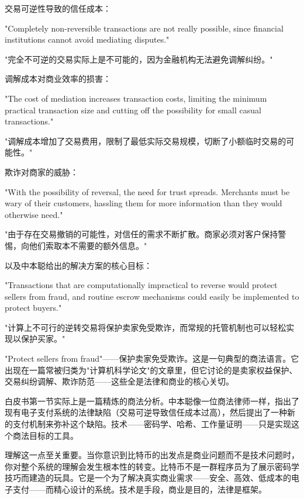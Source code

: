 \documentclass[a4paper,12pt,openany]{ctexbook}
\newenvironment{quoting}{%
  \par\vspace{0.5em}%
  \begin{list}{}{%
    \setlength{\leftmargin}{2em}%
    \setlength{\rightmargin}{2em}%
    \setlength{\parsep}{0.3em}%
    \setlength{\itemsep}{0pt}%
    \setlength{\topsep}{0pt}%
  }%
  \item\relax
}{%
  \end{list}%
  \par\vspace{0.5em}%
}
\begin{document}
交易可逆性导致的信任成本：


\begin{quoting}
\small
"Completely non-reversible transactions are not really possible, since financial institutions cannot avoid mediating disputes."

"完全不可逆的交易实际上是不可能的，因为金融机构无法避免调解纠纷。"
\end{quoting}


调解成本对商业效率的损害：


\begin{quoting}
\small
"The cost of mediation increases transaction costs, limiting the minimum practical transaction size and cutting off the possibility for small casual transactions."

"调解成本增加了交易费用，限制了最低实际交易规模，切断了小额临时交易的可能性。"
\end{quoting}


欺诈对商家的威胁：


\begin{quoting}
\small
"With the possibility of reversal, the need for trust spreads. Merchants must be wary of their customers, hassling them for more information than they would otherwise need."

"由于存在交易撤销的可能性，对信任的需求不断扩散。商家必须对客户保持警惕，向他们索取本不需要的额外信息。"
\end{quoting}


以及中本聪给出的解决方案的核心目标：


\begin{quoting}
\small
"Transactions that are computationally impractical to reverse would protect sellers from fraud, and routine escrow mechanisms could easily be implemented to protect buyers."

"计算上不可行的逆转交易将保护卖家免受欺诈，而常规的托管机制也可以轻松实现以保护买家。"
\end{quoting}


"Protect sellers from fraud"——保护卖家免受欺诈。这是一句典型的商法语言。它出现在一篇常被归类为"计算机科学论文"的文章里，但它讨论的是卖家权益保护、交易纠纷调解、欺诈防范——这些全是法律和商业的核心关切。

白皮书第一节实际上是一篇精炼的商法分析。中本聪像一位商法律师一样，指出了现有电子支付系统的法律缺陷（交易可逆导致信任成本过高），然后提出了一种新的支付机制来弥补这个缺陷。技术——密码学、哈希、工作量证明——只是实现这个商法目标的工具。

理解这一点至关重要。当你意识到比特币的出发点是商业问题而不是技术问题时，你对整个系统的理解会发生根本性的转变。比特币不是一群程序员为了展示密码学技巧而建造的玩具。它是一个为了解决真实商业需求——安全、高效、低成本的电子支付——而精心设计的系统。技术是手段，商业是目的，法律是框架。
\end{document}
